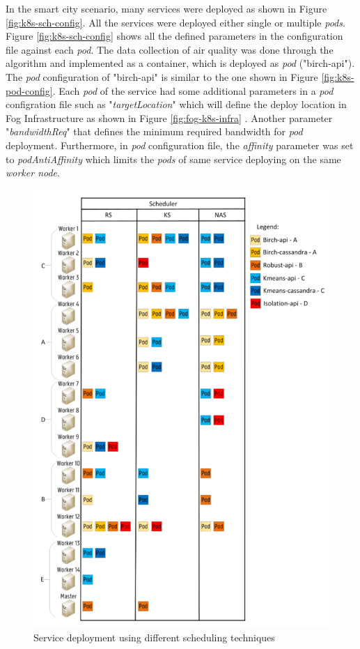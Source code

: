   In the smart city scenario, many services were deployed as shown in Figure \ref{fig:k8s-sch-config}. All the services were deployed either single or multiple \emph{pods}. Figure \ref{fig:k8s-sch-config} shows all the defined parameters in the configuration file against each \emph{pod}. The data collection of air quality was done through the algorithm and implemented as a container, which is deployed as \emph{pod} ("birch-api")\cite{Santos2019}. The \emph{pod} configuration of "birch-api" is similar to the one shown in Figure \ref{fig:k8s-pod-config}. Each \emph{pod} of the service  had some additional parameters in a \emph{pod} configration file such as "\emph{targetLocation}" which will define the deploy location in Fog Infrastructure as shown in Figure \ref{fig:fog-k8s-infra} \cite{Santos2019}. Another parameter "\emph{bandwidthReq}" that defines the minimum required bandwidth for \emph{pod} deployment\cite{Santos2019}. Furthermore, in \emph{pod} configuration file, the \emph{affinity} parameter was set to \emph{podAntiAffinity} which limits the \emph{pods} of same service deploying on the same \emph{worker node}\cite{Santos2019}.
  \begin{figure}
    \centering
    \includegraphics[width=\linewidth]{figures/mlcn-k8s-service-prov.pdf}
    \caption{Service deployment using different scheduling techniques\cite{Santos2019}}
    \label{fig:k8s-service}
  \end{figure}
